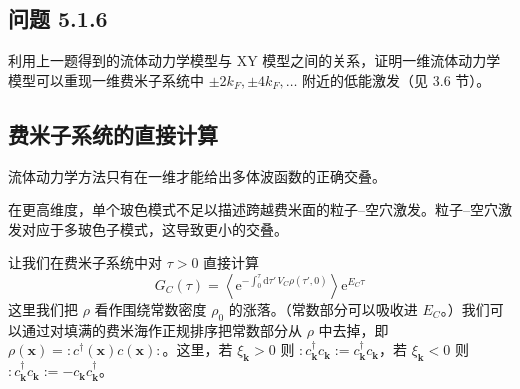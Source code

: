 \subsection*{问题 5.1.6}

利用上一题得到的流体动力学模型与 XY 模型之间的关系，证明一维流体动力学模型可以重现一维费米子系统中 $\pm2k_F,\pm4k_F,\ldots$ 附近的低能激发（见 3.6 节）。

\subsection{费米子系统的直接计算}

\begin{keypoints}
\item 流体动力学方法只有在一维才能给出多体波函数的正确交叠。
\item 在更高维度，单个玻色模式不足以描述跨越费米面的粒子--空穴激发。粒子--空穴激发对应于多玻色子模式，这导致更小的交叠。
\end{keypoints}

让我们在费米子系统中对 $\tau>0$ 直接计算
\begin{equation*}
G_C(\tau)=\left\langle\mathrm{e}^{-\int_0^{\tau}\mathrm{d}\tau'\,V_C\rho(\tau',0)}\right\rangle\mathrm{e}^{E_C\tau}
\end{equation*}
这里我们把 $\rho$ 看作围绕常数密度 $\rho_0$ 的涨落。（常数部分可以吸收进 $E_C$。）我们可以通过对填满的费米海作正规排序把常数部分从 $\rho$ 中去掉，即 $\rho(\pmb{x})=:c^{\dagger}(\pmb{x})c(\pmb{x}):$。这里，若 $\xi_{\pmb{k}}>0$ 则 $:c_{\pmb{k}}^{\dagger}c_{\pmb{k}}:=c_{\pmb{k}}^{\dagger}c_{\pmb{k}}$，若 $\xi_{\pmb{k}}<0$ 则 $:c_{\pmb{k}}^{\dagger}c_{\pmb{k}}:=-c_{\pmb{k}}c_{\pmb{k}}^{\dagger}$。

